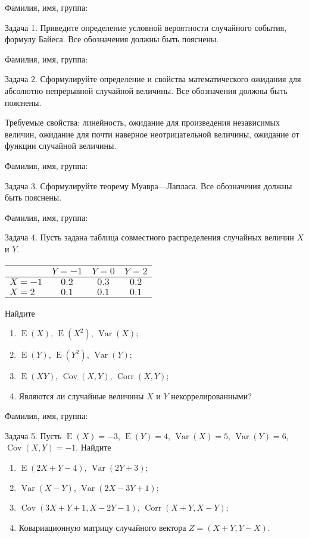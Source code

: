 \documentclass[12pt]{article}
\DeclareMathOperator{\Cov}{Cov}
\DeclareMathOperator{\Corr}{Corr}
\DeclareMathOperator{\Var}{Var}
\DeclareMathOperator{\E}{E}
\begin{document}
Фамилия, имя, группа:

\vspace{40pt}

Задача 1. Приведите определение условной вероятности случайного события, формулу Байеса. Все обозначения должны быть пояснены.

\newpage
Фамилия, имя, группа:

\vspace{40pt}

Задача 2. Сформулируйте определение и свойства математического ожидания 
для абсолютно непрерывной случайной величины. 
Все обозначения должны быть пояснены.

Требуемые свойства: 
линейность, ожидание для произведения независимых величин,
ожидание для почти наверное неотрицательной величины, ожидание от функции случайной величины.

\newpage
Фамилия, имя, группа:

\vspace{40pt}

Задача 3. Сформулируйте теорему Муавра—Лапласа.
 Все обозначения должны быть пояснены.

\newpage
Фамилия, имя, группа:

\vspace{40pt}

Задача 4. Пусть задана таблица совместного распределения случайных величин $X$ и $Y$.

\begin{center}\begin{tabular}{lccc}
\toprule
   & $Y=-1$  & $Y=0$   & $Y=2$   \\ \midrule
$X=-1$                 & $0.2$ & $0.3$ & $0.2$ \\
 $X=2$                 & $0.1$ & $0.1$ & $0.1$ \\ \bottomrule
\end{tabular}\end{center}

Найдите
\begin{enumerate}
    \item $\E(X)$, $\E(X^{2})$, $\Var(X)$;
    \item $\E(Y)$, $\E(Y^{2})$, $\Var(Y)$;
    \item $\E(XY)$, $\Cov(X,Y)$, $\Corr(X,Y)$;
    \item Являются ли случайные величины $X$ и $Y$ некоррелированными?
\end{enumerate}


\newpage
Фамилия, имя, группа:

\vspace{40pt}

Задача 5. Пусть $\E(X)=-3$, $\E(Y)=4$, $\Var(X) = 5$, $\Var(Y) = 6$, $\Cov(X,Y) = -1$. Найдите
\begin{enumerate}
\item $\E(2X + Y - 4)$, $\Var(2Y + 3)$;
\item $\Var(X - Y)$, $\Var(2X - 3Y +1)$;
\item $\Cov(3X+ Y + 1,X - 2Y -1)$, $\Corr(X + Y, X - Y)$;
\item Ковариационную матрицу случайного вектора $Z = (X+Y, Y-X)$.
\end{enumerate}
\end{document}
